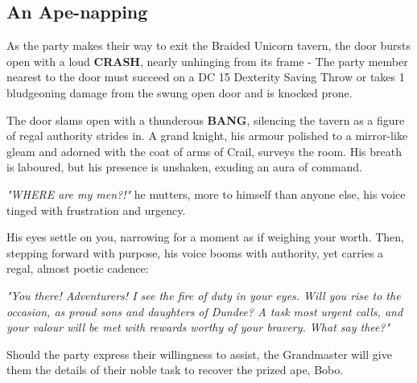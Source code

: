 \subsection*{An Ape-napping}
{\entryfont As the party makes their way to exit the Braided Unicorn tavern, the door bursts open with a loud \textbf{CRASH}, nearly unhinging from its frame - The party member nearest to the door must succeed on a DC 15 Dexterity Saving Throw or takes 1 bludgeoning damage from the swung open door and is knocked prone.}

\begin{DndReadAloud}
	The door slams open with a thunderous \textbf{BANG}, silencing the tavern as a figure of regal authority strides in. A grand knight, his armour polished to a mirror-like gleam and adorned with the coat of arms of Crail, surveys the room. His breath is laboured, but his presence is unshaken, exuding an aura of command.

	\textit{"WHERE are my men?!"} he mutters, more to himself than anyone else, his voice tinged with frustration and urgency.

	His eyes settle on you, narrowing for a moment as if weighing your worth. Then, stepping forward with purpose, his voice booms with authority, yet carries a regal, almost poetic cadence:

	\textit{"You there! Adventurers! I see the fire of duty in your eyes. Will you rise to the occasion, as proud sons and daughters of Dundee? A task most urgent calls, and your valour will be met with rewards worthy of your bravery. What say thee?"}
\end{DndReadAloud}

{\noindent\entryfont Should the party express their willingness to assist, the Grandmaster will give them the details of their noble task to recover the prized ape, Bobo.}

